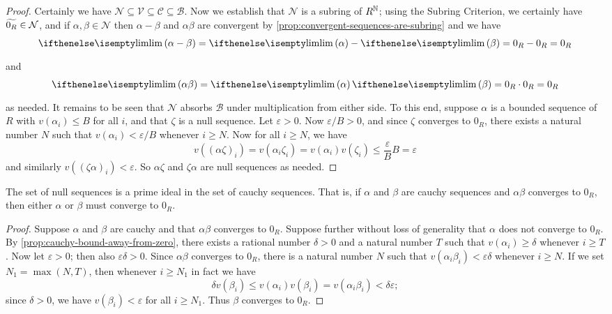 \begin{proof}
Certainly we have \(\mathcal{N} \subseteq \mathcal{V} \subseteq \mathcal{C} \subseteq \mathcal{B}\). Now we establish that \(\mathcal{N}\) is a subring of \(R^{\mathbb{N}}\); using the Subring Criterion, we certainly have \(\widetilde{0_R} \in \mathcal{N}\), and if \(\alpha,\beta \in \mathcal{N}\) then \(\alpha - \beta\) and \(\alpha\beta\) are convergent by \ref{prop:convergent-sequences-are-subring} and we have \[ \LIM{\alpha - \beta} = \LIM{\alpha} - \LIM{\beta} = 0_R - 0_R = 0_R \] and \[ \LIM{\alpha\beta} = \LIM{\alpha}\LIM{\beta} = 0_R \cdot 0_R = 0_R \] as needed. It remains to be seen that \(\mathcal{N}\) absorbs \(\mathcal{B}\) under multiplication from either side. To this end, suppose \(\alpha\) is a bounded sequence of \(R\) with \(v(\alpha_i) \leq B\) for all \(i\), and that \(\zeta\) is a null sequence. Let \(\varepsilon > 0\). Now \(\varepsilon/B > 0\), and since \(\zeta\) converges to \(0_R\), there exists a natural number \(N\) such that \(v(\alpha_i) < \varepsilon/B\) whenever \(i \geq N\). Now for all \(i \geq N\), we have \[ v((\alpha\zeta)_i) = v(\alpha_i \zeta_i) = v(\alpha_i)v(\zeta_i) \leq \frac{\varepsilon}{B} B = \varepsilon \] and similarly \(v((\zeta\alpha)_i) < \varepsilon\). So \(\alpha\zeta\) and \(\zeta\alpha\) are null sequences as needed.
\end{proof}

\begin{prop}
The set of null sequences is a prime ideal in the set of cauchy sequences. That is, if \(\alpha\) and \(\beta\) are cauchy sequences and \(\alpha\beta\) converges to \(0_R\), then either \(\alpha\) or \(\beta\) must converge to \(0_R\).
\end{prop}

\begin{proof}
Suppose \(\alpha\) and \(\beta\) are cauchy and that \(\alpha\beta\) converges to \(0_R\). Suppose further without loss of generality that \(\alpha\) does not converge to \(0_R\). By \ref{prop:cauchy-bound-away-from-zero}, there exists a rational number \(\delta > 0\) and a natural number \(T\) such that \(v(\alpha_i) \geq \delta\) whenever \(i \geq T\). Now let \(\varepsilon > 0\); then also \(\varepsilon\delta > 0\). Since \(\alpha\beta\) converges to \(0_R\), there is a natural number \(N\) such that \(v(\alpha_i\beta_i) < \varepsilon\delta\) whenever \(i \geq N\). If we set \(N_1 = \max(N, T)\), then whenever \(i \geq N_1\) in fact we have \[ \delta v(\beta_i) \leq v(\alpha_i)v(\beta_i) = v(\alpha_i\beta_i) < \delta\varepsilon; \] since \(\delta > 0\), we have \(v(\beta_i) < \varepsilon\) for all \(i \geq N_1\). Thus \(\beta\) converges to \(0_R\).
\end{proof}

